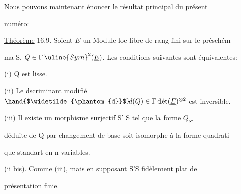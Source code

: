 Nous pouvons maintenant énoncer le résultat principal du présent

numéro:

\uline{Théorème} 16.9. Soient $\underline{E}$ un Module loc libre de rang fini sur le préschém-%

ma S, $Q \in \Gamma\,\uline{Sym}^2(\underline{E})$. Les conditions suivantes sont équivalentes:

(i) Q est lisse.

(ii) Le dscriminant modifié $\hand{$\widetilde{\phantom{d}}$}\!d(Q) \in \Gamma\,\text{dét}(\underline{E})^{\otimes 2}$ est inversible.

(iii)  Il existe un morphisme surjectif S' \quad S tel que la forme $Q_{S'}$

déduite de Q par changement de base soit isomorphe à la forme quadrati-%

que standart en n variables.

(ii bis). Comme (iii), mais en supposant S'\hand{$\rightarrow$}S fidèlement plat de

présentation finie.

